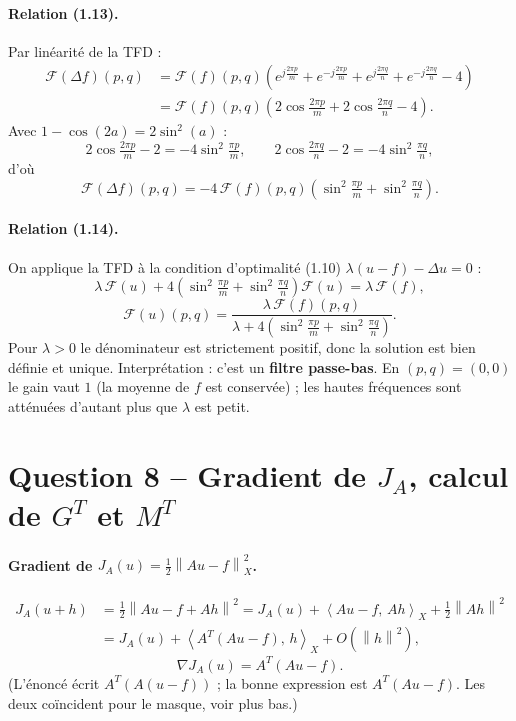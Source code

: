 \documentclass[11pt,a4paper]{article}
\newcommand{\X}{X}
\newcommand{\ps}[2]{\left\langle #1,\, #2 \right\rangle}
\newcommand{\nr}[1]{\left\| #1 \right\|}
\newcommand{\F}{\mathcal{F}}
\begin{document}
\paragraph{Relation (1.13).}
Par linéarité de la TFD :
\begin{align*}
  \F(\Delta f)(p,q) &= \F(f)(p,q)\left( e^{j\frac{2\pi p}{m}} + e^{-j\frac{2\pi p}{m}} + e^{j\frac{2\pi q}{n}} + e^{-j\frac{2\pi q}{n}} - 4 \right) \\
  &= \F(f)(p,q)\left( 2\cos\tfrac{2\pi p}{m} + 2\cos\tfrac{2\pi q}{n} - 4 \right).
\end{align*}
Avec $1-\cos(2a) = 2\sin^2(a)$ :
\[
  2\cos\tfrac{2\pi p}{m} - 2 = -4\sin^2\tfrac{\pi p}{m}, \qquad 2\cos\tfrac{2\pi q}{n} - 2 = -4\sin^2\tfrac{\pi q}{n},
\]
d'où
\[
  \boxed{\F(\Delta f)(p,q) = -4\,\F(f)(p,q)\left(\sin^2\tfrac{\pi p}{m} + \sin^2\tfrac{\pi q}{n}\right).} \tag{1.13}
\]

\paragraph{Relation (1.14).}
On applique la TFD à la condition d'optimalité (1.10) $\lambda(u-f) - \Delta u = 0$ :
\[
  \lambda\,\F(u) + 4\left(\sin^2\tfrac{\pi p}{m} + \sin^2\tfrac{\pi q}{n}\right)\F(u) = \lambda\,\F(f),
\]
\[
  \boxed{\F(u)(p,q) = \frac{\lambda\,\F(f)(p,q)}{\lambda + 4\left(\sin^2\frac{\pi p}{m} + \sin^2\frac{\pi q}{n}\right)}.} \tag{1.14}
\]
Pour $\lambda>0$ le dénominateur est strictement positif, donc la solution est bien définie et unique.
Interprétation : c'est un \textbf{filtre passe-bas}. En $(p,q)=(0,0)$ le gain vaut $1$ (la moyenne de $f$ est
conservée) ; les hautes fréquences sont atténuées d'autant plus que $\lambda$ est petit.

\section*{Question 8 -- Gradient de $J_A$, calcul de $G^T$ et $M^T$}

\paragraph{Gradient de $J_A(u) = \frac12\nr{Au-f}_\X^2$.}
\begin{align*}
  J_A(u+h) &= \tfrac12\nr{Au - f + Ah}^2 = J_A(u) + \ps{Au-f}{Ah}_\X + \tfrac12\nr{Ah}^2 \\
  &= J_A(u) + \ps{A^{T}(Au-f)}{h}_\X + O(\nr{h}^2),
\end{align*}
\[
  \boxed{\nabla J_A(u) = A^{T}(Au - f).}
\]
(L'énoncé écrit $A^T(A(u-f))$ ; la bonne expression est $A^T(Au-f)$. Les deux coïncident pour le masque, voir plus bas.)
\end{document}
